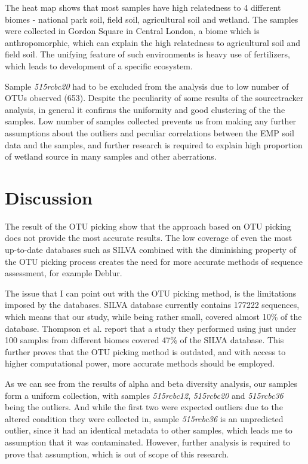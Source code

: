 \documentclass[12pt,twocolumn]{article} %
\begin{document}
The heat map shows that most samples have high relatedness to 4 different biomes - national park soil, field soil, agricultural soil and wetland. The samples were collected in Gordon Square in Central London, a biome which is anthropomorphic, which can explain the high relatedness to agricultural soil and field soil. The unifying feature of such environments is heavy use of fertilizers, which leads to development of a specific ecosystem\cite{Zhalnina2014}.
\par
Sample \textit{515rcbc20} had to be excluded from the analysis due to low number of OTUs observed (653). Despite the peculiarity of some results of the sourcetracker analysis, in general it confirms the uniformity and good clustering of the the samples. Low number of samples collected prevents us from making any further assumptions about the outliers and peculiar correlations between the EMP soil data and the samples, and further research is required to explain high proportion of wetland source in many samples and other aberrations.



\par

%
%

\section{Discussion}
The result of the OTU picking show that the approach based on OTU picking does not provide the most accurate results. The low coverage of even the most up-to-date databases such as SILVA combined with the diminishing property of the OTU picking process creates the need for more accurate methods of sequence assessment, for example Deblur\cite{Amir}.
\par
The issue that I can point out with the OTU picking method, is the limitations imposed by the databases. SILVA database currently contains 177222 sequences, which means that our study, while being rather small, covered almost 10\% of the database. Thompson et al.\cite{Thompson2017} report that a study they performed using just under 100 samples from different biomes covered  47\% of the SILVA database. This further proves that the OTU picking method is outdated, and with access to higher computational power, more accurate methods should be employed.
\par
As we can see from the results of alpha and beta diversity analysis, our samples form a uniform collection, with samples \textit{515rcbc12}, \textit{515rcbc20} and \textit{515rcbc36} being the outliers. And while the first two were expected outliers due to the altered condition they were collected in, sample \textit{515rcbc36} is an unpredicted outlier, since it had an identical metadata to other samples, which leads me to assumption that it was contaminated. However, further analysis is required to prove that assumption, which is out of scope of this research.
\par
\end{document}
